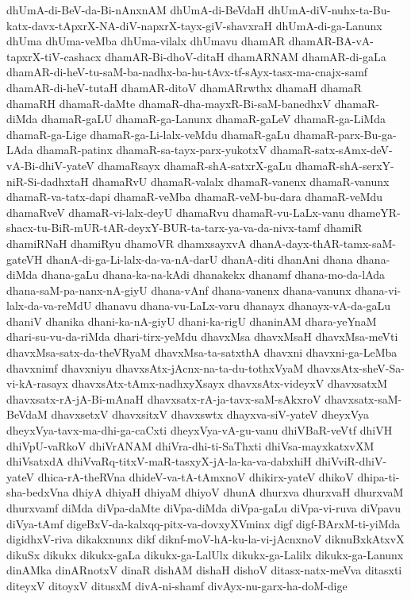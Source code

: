 {dhUmA-di-BeV-da-Bi-nAnxnAM
dhUmA-di-BeVdaH
dhUmA-diV-nuhx-ta-Bu-katx-davx-tApxrX-NA-diV-napxrX-tayx-giV-shavxraH
dhUmA-di-ga-Lanunx
dhUma
dhUma-veMba
dhUma-vilalx
dhUmavu
dhamAR
dhamAR-BA-vA-tapxrX-tiV-cashacx
dhamAR-Bi-dhoV-ditaH
dhamARNAM
dhamAR-di-gaLa
dhamAR-di-heV-tu-saM-ba-nadhx-ba-hu-tAvx-tf-sAyx-tasx-ma-cnajx-samf
dhamAR-di-heV-tutaH
dhamAR-ditoV
dhamARrwthx
dhamaH
dhamaR
dhamaRH
dhamaR-daMte
dhamaR-dha-mayxR-Bi-saM-banedhxV
dhamaR-diMda
dhamaR-gaLU
dhamaR-ga-Lanunx
dhamaR-gaLeV
dhamaR-ga-LiMda
dhamaR-ga-Lige
dhamaR-ga-Li-lalx-veMdu
dhamaR-gaLu
dhamaR-parx-Bu-ga-LAda
dhamaR-patinx
dhamaR-sa-tayx-parx-yukotxV
dhamaR-satx-sAmx-deV-vA-Bi-dhiV-yateV
dhamaRsayx
dhamaR-shA-satxrX-gaLu
dhamaR-shA-serxY-niR-Si-dadhxtaH
dhamaRvU
dhamaR-valalx
dhamaR-vanenx
dhamaR-vanunx
dhamaR-va-tatx-dapi
dhamaR-veMba
dhamaR-veM-bu-dara
dhamaR-veMdu
dhamaRveV
dhamaR-vi-lalx-deyU
dhamaRvu
dhamaR-vu-LaLx-vanu
dhameYR-shacx-tu-BiR-mUR-tAR-deyxY-BUR-ta-tarx-ya-va-da-nivx-tamf
dhamiR
dhamiRNaH
dhamiRyu
dhamoVR
dhamxsayxvA
dhanA-dayx-thAR-tamx-saM-gateVH
dhanA-di-ga-Li-lalx-da-va-nA-darU
dhanA-diti
dhanAni
dhana
dhana-diMda
dhana-gaLu
dhana-ka-na-kAdi
dhanakekx
dhanamf
dhana-mo-da-lAda
dhana-saM-pa-nanx-nA-giyU
dhana-vAnf
dhana-vanenx
dhana-vanunx
dhana-vi-lalx-da-va-reMdU
dhanavu
dhana-vu-LaLx-varu
dhanayx
dhanayx-vA-da-gaLu
dhaniV
dhanika
dhani-ka-nA-giyU
dhani-ka-rigU
dhaninAM
dhara-yeYnaM
dhari-su-vu-da-riMda
dhari-tirx-yeMdu
dhavxMsa
dhavxMsaH
dhavxMsa-meVti
dhavxMsa-satx-da-theVRyaM
dhavxMsa-ta-satxthA
dhavxni
dhavxni-ga-LeMba
dhavxnimf
dhavxniyu
dhavxsAtx-jAcnx-na-ta-du-tothxVyaM
dhavxsAtx-sheV-Sa-vi-kA-rasayx
dhavxsAtx-tAmx-nadhxyXsayx
dhavxsAtx-videyxV
dhavxsatxM
dhavxsatx-rA-jA-Bi-mAnaH
dhavxsatx-rA-ja-tavx-saM-sAkxroV
dhavxsatx-saM-BeVdaM
dhavxsetxV
dhavxsitxV
dhavxswtx
dhayxva-siV-yateV
dheyxVya
dheyxVya-tavx-ma-dhi-ga-caCxti
dheyxVya-vA-gu-vanu
dhiVBaR-veVtf
dhiVH
dhiVpU-vaRkoV
dhiVrANAM
dhiVra-dhi-ti-SaThxti
dhiVsa-mayxkatxvXM
dhiVsatxdA
dhiVvaRq-titxV-maR-tasxyX-jA-la-ka-va-dabxhiH
dhiVviR-dhiV-yateV
dhica-rA-theRVna
dhideV-va-tA-tAmxnoV
dhikirx-yateV
dhikoV
dhipa-ti-sha-bedxVna
dhiyA
dhiyaH
dhiyaM
dhiyoV
dhunA
dhurxva
dhurxvaH
dhurxvaM
dhurxvamf
diMda
diVpa-daMte
diVpa-diMda
diVpa-gaLu
diVpa-vi-ruva
diVpavu
diVya-tAmf
digeBxV-da-kalxqq-pitx-va-dovxyXVminx
digf
digf-BArxM-ti-yiMda
digidhxV-riva
dikakxnunx
dikf
diknf-moV-hA-ku-la-vi-jAcnxnoV
diknuBxkAtxvX
dikuSx
dikukx
dikukx-gaLa
dikukx-ga-LalUlx
dikukx-ga-Lalilx
dikukx-ga-Lanunx
dinAMka
dinARnotxV
dinaR
dishAM
dishaH
dishoV
ditasx-natx-meVva
ditasxti
diteyxV
ditoyxV
ditusxM
divA-ni-shamf
divAyx-nu-garx-ha-doM-dige
}
